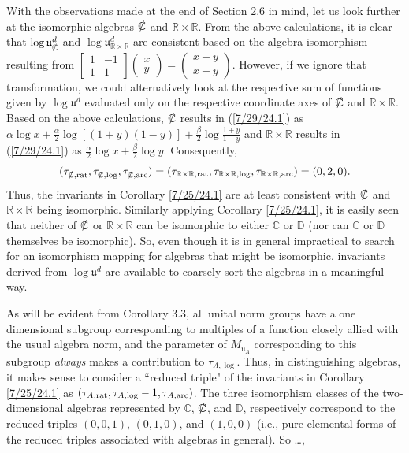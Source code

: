 \documentclass{amsart}
\numberwithin{equation}{section}
\theoremstyle{definition}
\numberwithin{theorem}{section}
\begin{document}
With the observations made at the end of Section 2.6 in mind, let us look further at the isomorphic algebras $\slashed{\mathbb{C}}$ and $\mathbb{R}\times\mathbb{R}$.  From the above calculations, it is clear that $\log\mathfrak{u}^d_{\slashed{\mathbb{C}}}$ and $\log\mathfrak{u}^d_{\mathbb{R}\times\mathbb{R}}$ are consistent based on the algebra isomorphism resulting from $\left[\begin{array}{ccc}
 1 & -1   \\ 
 1 & 1    
\end{array}\right]\left(\begin{array}{ccc}
x   \\ 
y   
\end{array}\right) = \left(\begin{array}{ccc}
x-y   \\ 
x+y   
\end{array}\right)$.  However, if we ignore that transformation, we could alternatively look at the respective sum of functions given by $\log\mathfrak{u}^d$ evaluated only on the respective coordinate axes of $\slashed{\mathbb{C}}$ and $\mathbb{R}\times\mathbb{R}$.  Based on the above calculations, $\slashed{\mathbb{C}}$ results in (\ref{7/29/24.1}) as $\alpha\log x+ \frac{\alpha}{2}\log[(1+
y)(1-y)] +  \frac{\beta}{2}\log \frac{1+y}{1-y}$ and $\mathbb{R}\times\mathbb{R}$ results in (\ref{7/29/24.1}) as $\frac{\alpha}{2}\log x +\frac{\beta}{2} \log y$. Consequently,  \[(\tau_{\slashed{\mathbb{C}},{\rm rat}},\tau_{\slashed{\mathbb{C}},{\rm log}},\tau_{\slashed{\mathbb{C}},{\rm arc}}) = (\tau_{\mathbb{R}\times\mathbb{R},{\rm rat}},\tau_{\mathbb{R}\times\mathbb{R},{\rm log}},\tau_{\mathbb{R}\times\mathbb{R},{\rm arc}}) = (0,2,0). \] Thus, the invariants in Corollary \ref{7/25/24.1} are at least consistent with $\slashed{\mathbb{C}}$ and $\mathbb{R}\times\mathbb{R}$ being isomorphic.  Similarly applying Corollary \ref{7/25/24.1}, it is easily seen that neither of $\slashed{\mathbb{C}}$ or $\mathbb{R}\times\mathbb{R}$ can be isomorphic to either $\mathbb{C}$ or $\mathbb{D}$ (nor can  $\mathbb{C}$ or $\mathbb{D}$ themselves be isomorphic).   So, even though it is in general impractical to search for an isomorphism mapping for algebras that might be isomorphic, invariants derived from $\log\mathfrak{u}^d$ are available to coarsely sort the algebras in a meaningful way.



As will be evident from Corollary 3.3, all unital norm groups have a one dimensional subgroup corresponding to multiples of a function closely allied with the usual algebra norm, and the parameter of $M_{\mathfrak{u}_A}$ corresponding to this subgroup {\it always} makes a contribution to $\tau_{A,\log}$.  Thus, in distinguishing algebras, it makes sense to consider a ``reduced triple" of the invariants in Corollary \ref{7/25/24.1} as $(\tau_{A,{\rm rat}},\tau_{A,{\rm log}}-1,\tau_{A,{\rm arc}})$. 
 The three isomorphism classes of the two-dimensional algebras represented by $\mathbb{C}$, $\slashed{\mathbb{C}}$, and $\mathbb{D}$, respectively correspond to the reduced triples  $(0,0,1)$, $(0,1,0)$, and $(1,0,0)$ (i.e., pure elemental forms of the reduced triples associated with algebras in general).  So \dots,
 
\end{document}
